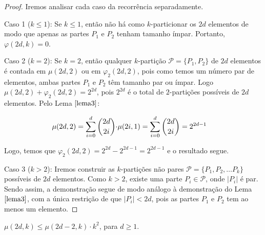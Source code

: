 \begin{proof} 
	Iremos analisar cada caso da recorrência separadamente. \newl
	
	Caso 1 ($k \leq 1$): Se $k \leq 1$, então não há como $k$-particionar os $2d$ elementos de modo que apenas as partes $P_1$ e $P_2$ tenham tamanho ímpar. Portanto, $\varphi(2d, k) = 0$. \newl
	
	Caso 2 ($k = 2$): Se $k = 2$, então qualquer $k$-partição $\mathcal{P} = \{P_1, P_2\}$ de $2d$ elementos é contada em $\mu(2d, 2)$ ou em $\varphi_2(2d, 2)$, pois como temos um número par de elementos, ambas partes $P_1$ e $P_2$ têm tamanho par ou ímpar. Logo $\mu(2d, 2) + \varphi_2(2d, 2) = 2^{2d}$, pois $2^{2d}$ é o total de $2$-partições possíveis de $2d$ elementos. Pelo Lema $\ref{lema3}$:
	
	\begin{align}
		\begin{split}
			\mu(2d, 2) &= \sum\limits_{i = 0}^{d}\escolhe{2d}{2i} {\cdot} \mu(2i, 1) = \sum\limits_{i = 0}^{d}\escolhe{2d}{2i} = 2^{2d-1}
		\end{split} 
	\end{align} 
	
	Logo, temos que $\varphi_2(2d, 2)  = 2^{2d} - 2^{2d - 1} = 2^{2d - 1}$ e o resultado segue. \newl
	
	
	Caso 3 ($k > 2$): Iremos construir as $k$-partições não pares $\mathcal{P} = \{P_1, P_2, \ldots P_k\}$ possíveis de $2d$ elementos. Como $k > 2$, existe uma parte $P_i \in \mathcal{P}$, onde $|P_i|$ é par. Sendo assim, a demonstração segue de modo análogo à demonstração do Lema $\ref{lema3}$, com a única restrição de que $|P_i| < 2d$, pois as partes $P_1$ e $P_2$ tem ao menos um elemento.
\end{proof} \newl


\begin{lema} 
	\label{lema5} 
	$\mu(2d, k) \leq \mu(2d - 2, k) {\cdot} k^{2}$, para $d \geq 1$.
\end{lema}

